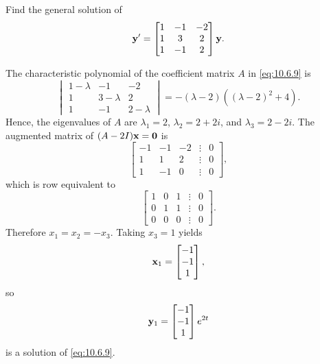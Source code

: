 \documentclass{ximera}
\begin{document}
\begin{example}\label{example:10.6.4}
 Find the general solution of
\begin{equation} \label{eq:10.6.9}
{\bf y}'=\begin{bmatrix}1&-1&-2\\1&3&2\\1&-1&2\end{bmatrix}{\bf y}.
\end{equation}

\begin{explanation} The characteristic
polynomial of the  coefficient matrix $A$ in  \eqref{eq:10.6.9} is
$$
\begin{vmatrix} 1-\lambda&-1&-2\\ 1&3-\lambda&
2\\ 1
&-1&2-\lambda\end{vmatrix}=
-(\lambda-2)\left((\lambda-2)^2+4\right).
 $$
Hence, the eigenvalues of $A$ are $\lambda_1=2$, $\lambda_2=2+2i$,
and $\lambda_3=2-2i$.
The augmented matrix of $(A-2I){\bf x=0}$ is
$$
\begin{bmatrix}-1&-1&-2&\vdots&0\\1&
1&2&\vdots&0\\ 1&-1&0&\vdots&0
\end{bmatrix},
$$
which is row equivalent to
$$
\begin{bmatrix} 1&0&1&\vdots&0\\ 0&1&1&
\vdots&0\\ 0&0&0&\vdots&0\end{bmatrix}.
$$
Therefore $x_1=x_2=-x_3$.  Taking $x_3=1$ yields
$$
{\bf x}_1=\begin{bmatrix}-1\\-1\\1\end{bmatrix},
$$
so
$$
{\bf y}_1=\begin{bmatrix}-1\\-1\\1\end{bmatrix}e^{2t}
$$
is a solution of  \eqref{eq:10.6.9}.


\end{explanation}
\end{example}
\end{document}
